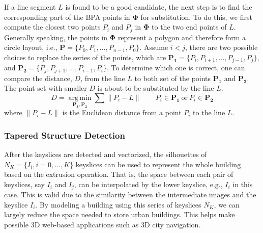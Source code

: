 \documentclass[12pt,letterpaper]{article}
\begin{document}
If a line segment $L$ is found to be a good candidate, the next step is to find the corresponding part of the
BPA points in $\boldsymbol{\Phi}$ for substitution. To do this, we first compute the closest two points
$P_i$ and $P_j$ in $\boldsymbol{\Phi}$ to the two end points of $L$.
Generally speaking, the points in $\boldsymbol{\Phi}$ represent a polygon and therefore form a circle layout, i.e.,
$\boldsymbol{P} = \{ P_0,P_1,\ldots ,P_{n-1}, P_0 \}$. Assume $i < j$, there are two possible choices to replace
the series of the points, which are
$\boldsymbol{P_1} = \{ P_i,P_{i+1},\ldots,P_{j-1}, P_j \}$, and
$\boldsymbol{P_2} = \{ P_j,P_{j+1},\ldots,P_{i-1}, P_i \}$.
To determine which one is correct, one can compare the distance, $D$, from the line $L$ to both
set of the points $\boldsymbol{P_1}$ and $\boldsymbol{P_2}$. The point set with smaller $D$ is
about to be substituted by the line $L$.
\begin{equation*}
D = \underset{\boldsymbol{P_1},\boldsymbol{P_2}}{\operatorname{arg\,min}}\sum{\lVert P_i - L \rVert}
\qquad P_i \in \boldsymbol{P_1} \ \text{or} \ P_i \in \boldsymbol{P_2}
\end{equation*}
where $\lVert P_i - L \rVert$ is the Euclidean distance from a point $P_i$ to the line $L$.



\subsubsection{Tapered Structure Detection}
\label{sec_tsd}
After the keyslices are detected and vectorized, the silhouettes of
$N_K = \{I_{i}, i = 0, ..., K \}$ keyslices
can be used to represent the whole building based on the extrusion operation.
That is, the space between each pair of keyslices, say $I_{i}$ and $I_{j}$,
can be interpolated by the lower keyslice, e.g., $I_{i}$ in this case.
This is valid due to the similarity between the intermediate images and the
keyslice $I_{i}$.
By modeling a building using this series of keyslices $N_K$, we can largely
reduce the space needed to store urban buildings.
This helps make possible 3D web-based applications such as 3D city navigation.
\end{document}
